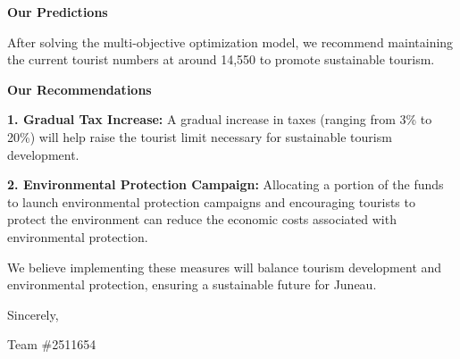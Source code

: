 \documentclass[12pt]{article}  %
\begin{document}
\noindent
\textbf{Our Predictions}

After solving the multi-objective optimization model, we recommend maintaining the current tourist numbers at around 14,550 to promote sustainable tourism.

\noindent
\textbf{Our Recommendations}

\textbf{1. Gradual Tax Increase: }A gradual increase in taxes (ranging from 3\% to 20\%) will help raise the tourist limit necessary for sustainable tourism development.

\textbf{2. Environmental Protection Campaign: }Allocating a portion of the funds to launch environmental protection campaigns and encouraging tourists to protect the environment can reduce the economic costs associated with environmental protection.

We believe implementing these measures will balance tourism development and environmental protection, ensuring a sustainable future for Juneau.

\noindent Sincerely,

\noindent Team \#2511654
%


 \clearpage   %
 
\end{document}
